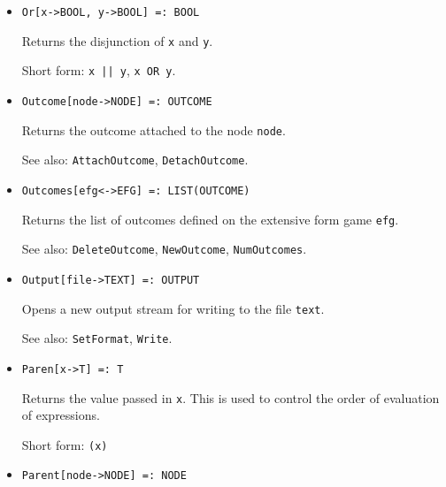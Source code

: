 \begin{itemize}

\item 
\protect \large \begin{verbatim}
Or[x->BOOL, y->BOOL] =: BOOL
\end{verbatim} \normalsize
  
\bd
Returns the disjunction of \verb+x+ and \verb+y+.
\item
[Short form:] \verb+x || y+, \verb+x OR y+.
\ed

\item
\protect \large \begin{verbatim}
Outcome[node->NODE] =: OUTCOME
\end{verbatim}\normalsize

\bd
Returns the outcome attached to the node \verb+node+.
\item
[See also:] {\tt AttachOutcome}, {\tt DetachOutcome}.
\ed

\item
\protect \large \begin{verbatim}
Outcomes[efg<->EFG] =: LIST(OUTCOME)
\end{verbatim}\normalsize

\bd
Returns the list of outcomes defined on the extensive form
game \verb+efg+.
\item
[See also:] {\tt DeleteOutcome}, {\tt NewOutcome}, {\tt NumOutcomes}.
\ed

\item
\protect \large \begin{verbatim}
Output[file->TEXT] =: OUTPUT
\end{verbatim}\normalsize

\bd
Opens a new output stream for writing to the file \verb+text+.
\item
[See also:] {\tt SetFormat}, {\tt Write}.
\ed


\item
\protect \large \begin{verbatim}
Paren[x->T] =: T
\end{verbatim}\normalsize

\bd
Returns the value passed in \verb+x+.  This is used to control
the order of evaluation of expressions.
\item
[Short form:] \verb+(x)+
\ed

\item
\protect \large \begin{verbatim}
Parent[node->NODE] =: NODE
\end{verbatim}\normalsize


\end{itemize}
